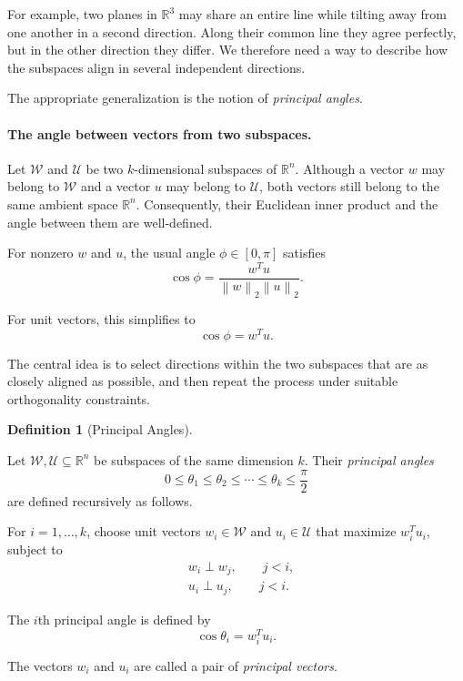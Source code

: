 \documentclass[14pt,letterpaper]{article}
\theoremstyle{plain}
\theoremstyle{definition}
\newtheorem{definition}[theorem]{Definition}
\theoremstyle{remark}
\newcommand{\R}{\mathbb{R}}
\newcommand{\norm}[1]{\left\lVert #1 \right\rVert}
\begin{document}
For example, two planes in $\R^3$ may share an entire line
while tilting away from one another in a second direction.
Along their common line they agree perfectly, but in the
other direction they differ. We therefore need a way to
describe how the subspaces align in several independent
directions.

The appropriate generalization is the notion of
\emph{principal angles}.

\paragraph{The angle between vectors from two subspaces.}

Let $\mathcal W$ and $\mathcal U$ be two $k$-dimensional
subspaces of $\R^n$. Although a vector $w$ may belong to
$\mathcal W$ and a vector $u$ may belong to $\mathcal U$,
both vectors still belong to the same ambient space $\R^n$.
Consequently, their Euclidean inner product and the angle
between them are well-defined.

For nonzero $w$ and $u$, the usual angle $\phi\in[0,\pi]$
satisfies
\[
\cos\phi=\frac{w^Tu}{\norm{w}_2\norm{u}_2}.
\]

For unit vectors, this simplifies to
\[
\cos\phi=w^Tu.
\]

The central idea is to select directions within the two
subspaces that are as closely aligned as possible, and
then repeat the process under suitable orthogonality
constraints.

\begin{definition}[Principal Angles]
\label{def:principal_angles}

Let $\mathcal W,\mathcal U\subseteq\R^n$ be subspaces of
the same dimension $k$. Their \emph{principal angles}
\[
0\leq\theta_1\leq\theta_2\leq\cdots\leq\theta_k
\leq\frac{\pi}{2}
\]
are defined recursively as follows.

For $i=1,\ldots,k$, choose unit vectors
$w_i\in\mathcal W$ and $u_i\in\mathcal U$ that maximize
$w_i^Tu_i$, subject to
\[
\begin{aligned}
&w_i\perp w_j,\qquad j<i,\\
&u_i\perp u_j,\qquad j<i.
\end{aligned}
\]

The $i$th principal angle is defined by
\[
\boxed{\cos\theta_i=w_i^Tu_i.}
\]

The vectors $w_i$ and $u_i$ are called a pair of
\emph{principal vectors}.

\end{definition}
\end{document}
